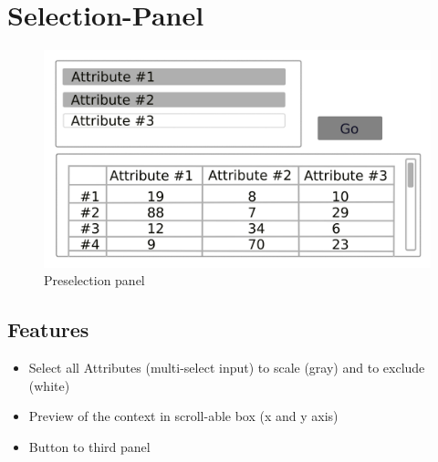 \documentclass[]{report}
\begin{document}
\section{Selection-Panel}
\begin{figure}[H]
	\includegraphics[width=\linewidth]{mock_up/panel-2.png}
	\caption{Preselection panel}
	\label{fig:p2}
\end{figure}

\subsection{Features}
\begin{itemize}
	\item Select all Attributes (multi-select input) to scale (gray) and to exclude (white)
	\item Preview of the context in scroll-able box (x and y axis)
	\item Button to third panel
\end{itemize}

\newpage
\end{document}
